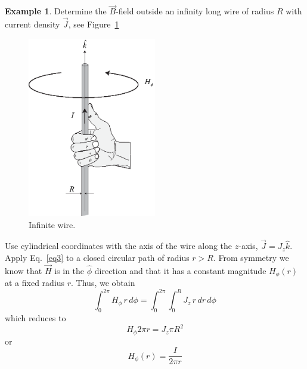 \documentclass[11pt,a4paper,oneside]{book}
\numberwithin{equation}{section}
\theoremstyle{it}
\theoremstyle{definition}
\newtheorem{example}{Example}[section]
\begin{document}
\begin{example}
	Determine the $\vec{B}$-field outside an infinity long wire of radius $R$ with current density $\vec{J}$, see Figure~\ref{infinite_wire}
\begin{figure}[H]
	\centering
	\includegraphics[width = 0.5\textwidth, width = 150pt, angle = 0, keepaspectratio]{figures/infinite_wire.eps}
	\captionsetup{width=0.75\textwidth}		
	\caption{Infinite wire.}
	\label{infinite_wire}
\end{figure}
Use cylindrical coordinates with the axis of the wire along the $z$-axis, $\vec{J}=J_z\hat{k}$. Apply Eq.~\eqref{eq3} to a closed circular path of radius $r>R$. From symmetry we know that $\vec{H}$ is in the $\hat{\phi}$ direction and that it has a constant magnitude $H_\phi(r)$ at a fixed radius $r$. Thus, we obtain
\begin{equation*}
	\int_{0}^{2\pi} H_{\phi}\,r\,d\phi=\int_{0}^{2\pi}\int_{0}^{R}J_z\,r\,dr\,d\phi
\end{equation*}
which reduces to
\begin{equation*}
	H_{\phi} 2\pi r = J_z\pi R^2
\end{equation*}
or
\begin{equation*}
	H_{\phi}(r)=\frac{I}{2\pi r}
\end{equation*}
\end{example}
\end{document}
